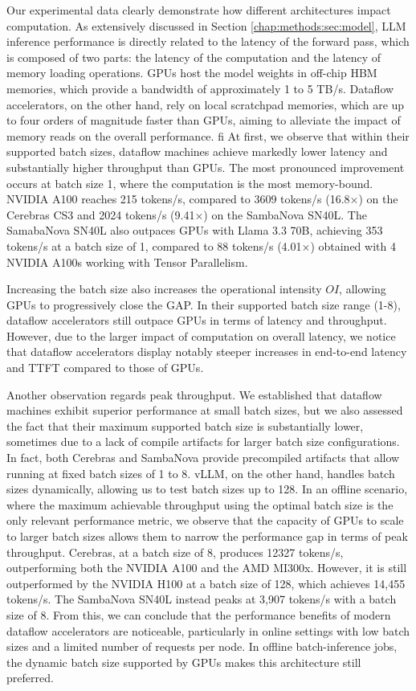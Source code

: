 Our experimental data clearly demonstrate how different architectures impact computation. As extensively discussed in Section \ref{chap:methods:sec:model}, LLM inference performance is directly related to the latency of the forward pass, which is composed of two parts: the latency of the computation and the latency of memory loading operations. GPUs host the model weights in off-chip HBM memories, which provide a bandwidth of approximately 1 to 5 TB/s. Dataflow accelerators, on the other hand, rely on local scratchpad memories, which are up to four orders of magnitude faster than GPUs, aiming to alleviate the impact of memory reads on the overall performance.
fi
At first, we observe that within their supported batch sizes, dataflow machines achieve markedly lower latency and substantially higher throughput than GPUs. The most pronounced improvement occurs at batch size 1, where the computation is the most memory-bound.
NVIDIA A100 reaches 215 tokens/s, compared to 3609 tokens/s (16.8$\times$) on the Cerebras CS3 and 2024 tokens/s (9.41$\times$) on the SambaNova SN40L.
The SamabaNova SN40L also outpaces GPUs with Llama 3.3 70B, achieving 353 tokens/s at a batch size of 1, compared to 88 tokens/s (4.01$\times$) obtained with 4 NVIDIA A100s working with Tensor Parallelism.

Increasing the batch size also increases the operational intensity $OI$, allowing GPUs to progressively close the GAP. In their supported batch size range (1-8), dataflow accelerators still outpace GPUs in terms of latency and throughput. However, due to the larger impact of computation on overall latency, we notice that dataflow accelerators display notably steeper increases in end-to-end latency and TTFT compared to those of GPUs.

Another observation regards peak throughput.
We established that dataflow machines exhibit superior performance at small batch sizes, but we also assessed the fact that their maximum supported batch size is substantially lower, sometimes due to a lack of compile artifacts for larger batch size configurations. In fact, both Cerebras and SambaNova provide precompiled artifacts that allow running at fixed batch sizes of 1 to 8. vLLM, on the other hand, handles batch sizes dynamically, allowing us to test batch sizes up to 128.
In an offline scenario, where the maximum achievable throughput using the optimal batch size is the only relevant performance metric, we observe that the capacity of GPUs to scale to larger batch sizes allows them to narrow the performance gap in terms of peak throughput. Cerebras, at a batch size of 8, produces 12327 tokens/s, outperforming both the NVIDIA A100 and the AMD MI300x. However, it is still outperformed by the NVIDIA H100 at a batch size of 128, which achieves 14,455 tokens/s. The SambaNova SN40L instead peaks at 3,907 tokens/s with a batch size of 8.
From this, we can conclude that the performance benefits of modern dataflow accelerators are noticeable, particularly in online settings with low batch sizes and a limited number of requests per node. In offline batch-inference jobs, the dynamic batch size supported by GPUs makes this architecture still preferred.

